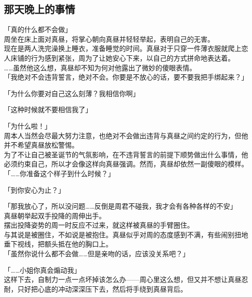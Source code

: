 \subsection{那天晚上的事情}

「真的什么都不会做」\\

周坐在床上面对真昼，将掌心朝向真昼并轻轻举起，表明自己的无害。\\

现在是两人洗完澡换上睡衣，准备睡觉的时间。真昼对于只穿一件薄衣服就爬上恋人床铺的行为感到紧张，周为了让她安心下来，以自己的方式拼命地表达着。\\

……虽然他这么想，真昼却不知为何对他露出了微妙的傻眼表情。\\

「我绝对不会违背誓言，绝对不会。你要是不放心的话，要不要我把手绑起来？」

「为什么你要对自己这么刻薄？我相信你啊」

「这种时候就不要相信我了」

「为什么啦！」\\

周本人当然会尽最大努力注意，也绝对不会做出违背与真昼之间约定的行为，但他并不希望真昼放松警惕。\\

为了不让自己被圣诞节的气氛影响，在不违背誓言的前提下顺势做出什么事情，他必须约束自己，所以才会像这样向真昼强调。然而，真昼却依然一副傻眼的模样。\\

「……你准备这个样子到什么时候？」

「到你安心为止？」

「那我放心了，所以没问题……反倒是周君不碰我，我才会有各种各样的不安」\\

真昼朝举起双手投降的周伸出手。\\

摆出投降姿势的周一时反应不过来，就这样被真昼的手臂圈住。\\

与其说是被圈住，不如说是被抱住。真昼似乎对周的态度感到不满，有些闹别扭地垂下视线，把额头抵在他的胸口上。\\

「虽然你说什么都不会做……但是亲吻的话，应该没关系吧？」

「……小姐你真会煽动我」\\

这样下去，自制力一点一点坏掉该怎么办——周心里这么想，但又并不想让真昼忍耐，只好把心底的冲动深深压下去，然后将手绕到真昼背后。\\

